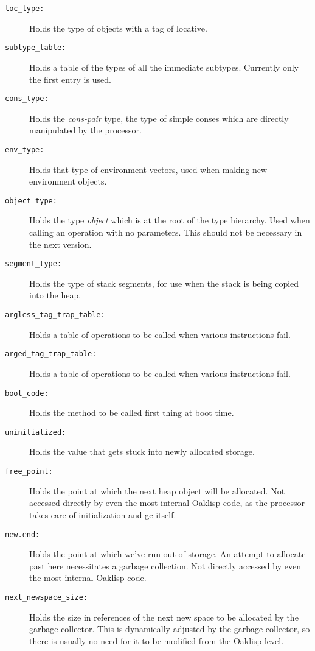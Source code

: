 \begin{description}
\item[\tt loc\_type:] Holds the type of objects with a tag of locative.

\item[\tt subtype\_table:] Holds a table of the types of all the immediate
subtypes.  Currently only the first entry is used.

\item[\tt cons\_type:] Holds the \emph{cons-pair} type, the type of simple
conses which are directly manipulated by the processor.

\item[\tt env\_type:] Holds that type of environment vectors, used when
making new environment objects.

\item[\tt object\_type:] Holds the type \emph{object} which is at the root
of the type hierarchy.  Used when calling an operation with no
parameters.  This should not be necessary in the next version.

\item[\tt segment\_type:] Holds the type of stack segments, for use when
the stack is being copied into the heap.

\item[\tt argless\_tag\_trap\_table:] Holds a table of operations to be
called when various instructions fail.

\item[\tt arged\_tag\_trap\_table:] Holds a table of operations to be
called when various instructions fail.

\item[\tt boot\_code:] Holds the method to be called first thing at boot time.

\item[\tt uninitialized:] Holds the value that gets stuck into newly
allocated storage.

\item[\tt free\_point:] Holds the point at which the next heap object will
be allocated.  Not accessed directly by even the most internal Oaklisp
code, as the processor takes care of initialization and gc itself.

\item[\tt new.end:] Holds the point at which we've run out of storage.  An
attempt to allocate past here necessitates a garbage collection.  Not
directly accessed by even the most internal Oaklisp code.

\item[\tt next\_newspace\_size:] Holds the size in references of the
next new space to be allocated by the garbage collector.  This is
dynamically adjusted by the garbage collector, so there is usually no
need for it to be modified from the Oaklisp level.

\end{description}




